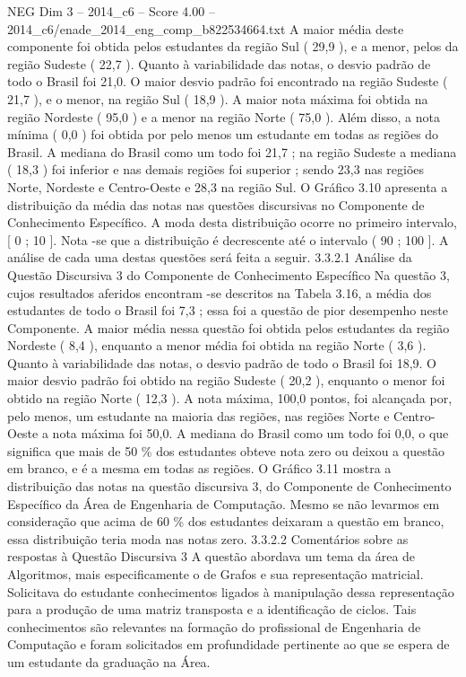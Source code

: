 \begin{textsample}{NEG Dim 3 – 2014\_c6 – Score 4.00 – 2014\_c6/enade\_2014\_eng\_comp\_b822534664.txt}
A maior média deste componente foi obtida pelos estudantes da região Sul ( 29,9 ), e a menor, pelos da região Sudeste ( 22,7 ).
Quanto à variabilidade das notas, o desvio padrão de todo o Brasil foi 21,0.
O maior desvio padrão foi encontrado na região Sudeste ( 21,7 ), e o menor, na região Sul ( 18,9 ).
A maior nota máxima foi obtida na região Nordeste ( 95,0 ) e a menor na região Norte ( 75,0 ).
Além disso, a nota mínima ( 0,0 ) foi obtida por pelo menos um estudante em todas as regiões do Brasil.
A mediana do Brasil como um todo foi 21,7 ; na região Sudeste a mediana ( 18,3 ) foi inferior e nas demais regiões foi superior ; sendo 23,3 nas regiões Norte, Nordeste e Centro-Oeste e 28,3 na região Sul.
O Gráfico 3.10 apresenta a distribuição da média das notas nas questões discursivas no Componente de Conhecimento Específico.
A moda desta distribuição ocorre no primeiro intervalo, [ 0 ; 10 ].
Nota -se que a distribuição é decrescente até o intervalo ( 90 ; 100 ].
A análise de cada uma destas questões será feita a seguir. 3.3.2.1 Análise da Questão Discursiva 3 do Componente de Conhecimento Específico Na questão 3, cujos resultados aferidos encontram -se descritos na Tabela 3.16, a média dos estudantes de todo o Brasil foi 7,3 ; essa foi a questão de pior desempenho neste Componente.
A maior média nessa questão foi obtida pelos estudantes da região Nordeste ( 8,4 ), enquanto a menor média foi obtida na região Norte ( 3,6 ).
Quanto à variabilidade das notas, o desvio padrão de todo o Brasil foi 18,9.
O maior desvio padrão foi obtido na região Sudeste ( 20,2 ), enquanto o menor foi obtido na região Norte ( 12,3 ).
A nota máxima, 100,0 pontos, foi alcançada por, pelo menos, um estudante na maioria das regiões, nas regiões Norte e Centro-Oeste a nota máxima foi 50,0.
A mediana do Brasil como um todo foi 0,0, o que significa que mais de 50 \% dos estudantes obteve nota zero ou deixou a questão em branco, e é a mesma em todas as regiões.
O Gráfico 3.11 mostra a distribuição das notas na questão discursiva 3, do Componente de Conhecimento Específico da Área de Engenharia de Computação.
Mesmo se não levarmos em consideração que acima de 60 \% dos estudantes deixaram a questão em branco, essa distribuição teria moda nas notas zero. 3.3.2.2 Comentários sobre as respostas à Questão Discursiva 3 A questão abordava um tema da área de Algoritmos, mais especificamente o de Grafos e sua representação matricial.
Solicitava do estudante conhecimentos ligados à manipulação dessa representação para a produção de uma matriz transposta e a identificação de ciclos.
Tais conhecimentos são relevantes na formação do profissional de Engenharia de Computação e foram solicitados em profundidade pertinente ao que se espera de um estudante da graduação na Área.

\end{textsample}
